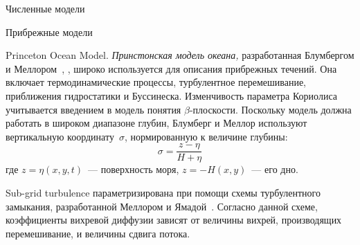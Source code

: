\begin{chapter}{Численные модели}
\begin{section}{Прибрежные модели}
\begin{paragraph}{Princeton Ocean Model.}%
\emph{Принстонская модель океана,}
разработанная Блумбергом и Меллором~\cite{Blumberg:1987}, \cite{Mellor:1998},
широко используется для описания прибрежных течений. Она включает 
термодинамические процессы, турбулентное 
перемешивание, приближения 
гидростатики и Буссинеска. 
Изменчивость параметра Кориолиса учитывается 
введением в модель понятия $\beta$-плоскости. Поскольку модель должна работать 
в широком диапазоне глубин, Блумберг и Меллор используют вертикальную
координату~$\sigma$, нормированную к величине глубины:
\begin{equation}
 \sigma = \frac{z-\eta}{H+\eta}
\end{equation}
где $z=\eta(x, y, t)$~--- поверхность моря, $z=-H(x,y)$~--- его дно.
%

Sub-grid turbulence
параметризирована при помощи схемы турбулентного замыкания, разработанной
Меллором и Ямадой~\cite{Mellor:1982}. Согласно данной схеме, 
коэффициенты вихревой диффузии зависят от величины вихрей, производящих
перемешивание,
и величины сдвига потока.
%


\end{paragraph}
\end{section}
\end{chapter}
